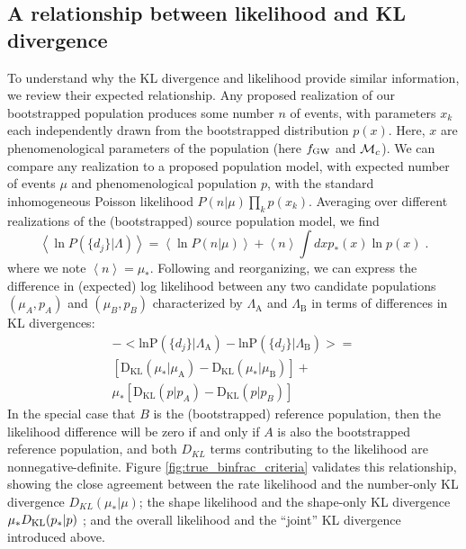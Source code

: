 \documentclass[twocolumn]{aastex631}
\newcommand\E[1]{{\left\langle #1 \right\rangle}}
\newcommand*{\pprob}{\mathrm{P}}
\newcommand*{\FormationParameters}{\Lambda}
\newcommand*{\gwdetj}{d_j}
\newcommand*{\gwdets}{\{\gwdetj\}}
\begin{document}
\subsection{A relationship between likelihood and KL divergence}
To understand why the KL divergence and likelihood provide similar information, we review their expected relationship.
Any proposed realization of our bootstrapped population produces some number $n$ of events, with parameters $x_k$ each
independently drawn from the bootstrapped distribution $p(x)$.  Here, $x$ are
phenomenological parameters of the population (here $f_{\rm GW}$ and ${\cal M}_c$).   We can compare any realization to
a proposed population model, with expected number of events $\mu$ and phenomenological population $p$, with the 
standard  inhomogeneous Poisson likelihood $ P(n|\mu) \prod_k p(x_k)$.  Averaging over different realizations of the
(bootstrapped)  source population model, we find
\begin{equation}
\E{\ln P(\{d_j\}|\Lambda)} = \E{\ln P(n|\mu) } + \E{n} \int d x p_*(x) \ln p(x) \; .
\end{equation}
where we note $\E{n}=\mu_*$.
Following \citet{1204.3117} and reorganizing, we can express the difference in (expected) log likelihood between any two
candidate populations $(\mu_A,p_A)$ and $(\mu_B,p_B)$ characterized by $\FormationParameters_{\mathrm{A}}$
    and $\FormationParameters_{\mathrm{B}}$   in terms of differences in KL divergences:
\begin{eqnarray}\label{eq:1204.3117.14}
- \Big<\mathrm{ln} \pprob(\gwdets|\FormationParameters_{\mathrm{A}}) 
    - \mathrm{ln} \pprob(\gwdets|\FormationParameters_{\mathrm{B}})\Big> = \\ \nonumber
    [
    \mathrm{D}_{\mathrm{KL}}(\mu_*|\mu_{\mathrm{A}}) -
    \mathrm{D}_{\mathrm{KL}}(\mu_*|\mu_{\mathrm{B}})
    ] + \\ \nonumber
    \mu_* [
    \mathrm{D}_{\mathrm{KL}}(p |p_A) -
    \mathrm{D}_{\mathrm{KL}}(p|p_B)
    ]
\end{eqnarray}
In the special case that $B$ is the (bootstrapped) reference population, then the likelihood difference will be zero if
and only if $A$ is also the bootstrapped reference population, and both $D_{KL}$ terms contributing to the likelihood
are nonnegative-definite.
Figure \ref{fig:true_binfrac_criteria} validates this relationship, showing the close agreement between the rate
likelihood and the number-only KL divergence $D_{KL}(\mu_*|\mu)$; the shape likelihood and the shape-only KL divergence
$\mu_* D_{\rm KL}(p_*|p)$ ; and the overall likelihood and the ``joint'' KL divergence introduced above.
\end{document}
